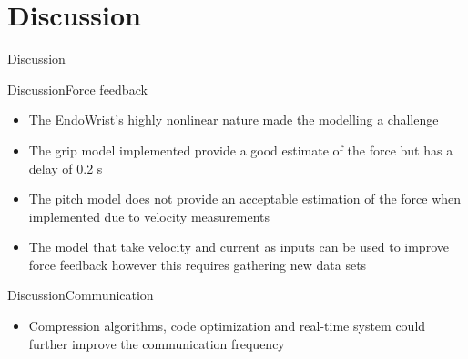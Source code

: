 \section{Discussion}

\begin{frame}{Discussion}{}	
	
\end{frame}

\begin{frame}{Discussion}{Force feedback}
	
	
	\begin{itemize}
		\item The EndoWrist's highly nonlinear nature made the modelling a challenge
		\item The grip model implemented provide a good estimate of the force but has a delay of 0.2 s 
		\item The pitch model does not provide an acceptable estimation of the force when implemented due to velocity measurements
		\item The model that take velocity and current as inputs can be used to improve force feedback however this requires gathering new data sets
	\end{itemize}
	
	
\end{frame}

\begin{frame}{Discussion}{Communication}


  \begin{itemize}
  	\item Compression algorithms, code optimization and real-time system could further improve the communication frequency
   
  \end{itemize}


\end{frame}






